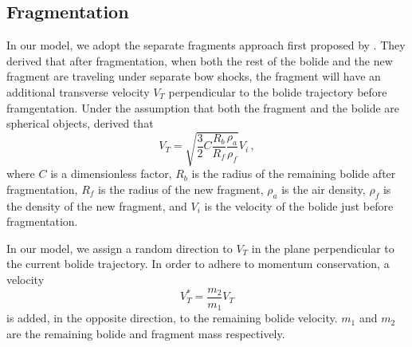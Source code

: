 \subsection{Fragmentation}

In our model, we adopt the separate fragments approach first proposed by \cite{passey1980effects}.
They derived that after fragmentation, when both the rest of the bolide and the new fragment are traveling under separate bow shocks, 
the fragment will have an additional transverse velocity $V_T$ perpendicular to the bolide trajectory before framgentation.
Under the assumption that both the fragment and the bolide are spherical objects,
\cite{passey1980effects} derived that
\begin{equation}
    V_T = \sqrt{\frac{3}{2}C\frac{R_b}{R_f}\frac{\rho_a}{\rho_f}}V_i\,,
    \label{eq:v_t}
\end{equation}
where $C$ is a dimensionless factor, $R_b$ is the radius of the remaining bolide after fragmentation,
$R_f$ is the radius of the new fragment, $\rho_a$ is the air density, $\rho_f$ is the density of the new fragment,
and $V_i$ is the velocity of the bolide just before fragmentation.

In our model, we assign a random direction to $V_T$ in the plane perpendicular to the current bolide trajectory.
In order to adhere to momentum conservation, a velocity
\begin{equation}
    V_T^* = \frac{m_2}{m_1}V_T
    \label{eq:v_t_star}
\end{equation}
is added, in the opposite direction, to the remaining bolide velocity.
$m_1$ and $m_2$ are the remaining bolide and fragment mass respectively.

